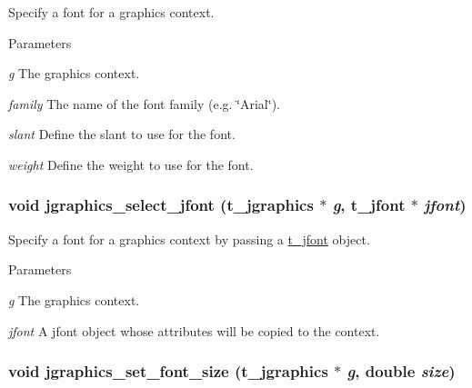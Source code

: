 Specify a font for a graphics context. 
\begin{DoxyParams}{Parameters}
\item[{\em g}]The graphics context. \item[{\em family}]The name of the font family (e.g. \char`\"{}Arial\char`\"{}). \item[{\em slant}]Define the slant to use for the font. \item[{\em weight}]Define the weight to use for the font. \end{DoxyParams}
\hypertarget{group__jgraphics_ga1299d24b9d9d6b0955a214e813c6463c}{
\subsubsection[{jgraphics\_\-select\_\-jfont}]{\setlength{\rightskip}{0pt plus 5cm}void jgraphics\_\-select\_\-jfont ({\bf t\_\-jgraphics} $\ast$ {\em g}, \/  {\bf t\_\-jfont} $\ast$ {\em jfont})}}
\label{group__jgraphics_ga1299d24b9d9d6b0955a214e813c6463c}


Specify a font for a graphics context by passing a \hyperlink{group__jfont_ga75f83f853e52af957c799723cac89ae5}{t\_\-jfont} object. 
\begin{DoxyParams}{Parameters}
\item[{\em g}]The graphics context. \item[{\em jfont}]A jfont object whose attributes will be copied to the context. \end{DoxyParams}
\hypertarget{group__jgraphics_gaf8c17f34bfbcd09ea7ba324a6a35cc9d}{
\subsubsection[{jgraphics\_\-set\_\-font\_\-size}]{\setlength{\rightskip}{0pt plus 5cm}void jgraphics\_\-set\_\-font\_\-size ({\bf t\_\-jgraphics} $\ast$ {\em g}, \/  double {\em size})}}
\label{group__jgraphics_gaf8c17f34bfbcd09ea7ba324a6a35cc9d}


